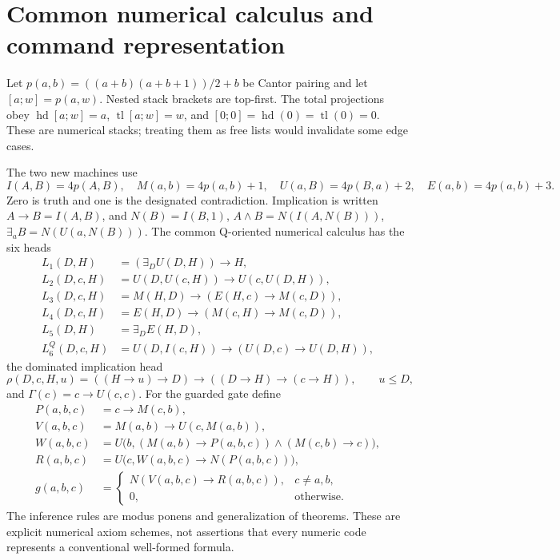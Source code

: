 \documentclass[11pt]{article}
\theoremstyle{definition}\newtheorem{definition}[theorem]{Definition}
\begin{document}
\section{Common numerical calculus and command representation}
\label{sec:calculus}

Let $p(a,b)=((a+b)(a+b+1))/2+b$ be Cantor pairing and let
$[a;w]=p(a,w)$. Nested stack brackets are top-first. The total projections
obey $\operatorname{hd}[a;w]=a$, $\operatorname{tl}[a;w]=w$, and
$[0;0]=\operatorname{hd}(0)=\operatorname{tl}(0)=0$. These are numerical
stacks; treating them as free lists would invalidate some edge cases.

The two new machines use
\[
 I(A,B)=4p(A,B),\quad M(a,b)=4p(a,b)+1,\quad
 U(a,B)=4p(B,a)+2,\quad E(a,b)=4p(a,b)+3.
\]
Zero is truth and one is the designated contradiction. Implication is
written $A\to B=I(A,B)$, and $N(B)=I(B,1)$,
$A\wedge B=N(I(A,N(B)))$, $\exists_aB=N(U(a,N(B)))$.
The common Q-oriented numerical calculus has the six heads
\begin{align*}
 L_1(D,H)&=(\exists_D U(D,H))\to H,\\
 L_2(D,c,H)&=U(D,U(c,H))\to U(c,U(D,H)),\\
 L_3(D,c,H)&=M(H,D)\to(E(H,c)\to M(c,D)),\\
 L_4(D,c,H)&=E(H,D)\to(M(c,H)\to M(c,D)),\\
 L_5(D,H)&=\exists_D E(H,D),\\
 L_6^Q(D,c,H)&=U(D,I(c,H))\to(U(D,c)\to U(D,H)),
\end{align*}
the dominated implication head
\[
 \rho(D,c,H,u)=((H\to u)\to D)\to((D\to H)\to(c\to H)),
 \qquad u\le D,
\]
and $\Gamma(c)=c\to U(c,c)$. For the guarded gate define
\begin{align*}
 P(a,b,c)&=c\to M(c,b),\\
 V(a,b,c)&=M(a,b)\to U(c,M(a,b)),\\
 W(a,b,c)&=U\bigl(b,(M(a,b)\to P(a,b,c))\wedge(M(c,b)\to c)\bigr),\\
 R(a,b,c)&=U\bigl(c,W(a,b,c)\to N(P(a,b,c))\bigr),\\
 g(a,b,c)&=\begin{cases}N(V(a,b,c)\to R(a,b,c)),&c\ne a,b,\\
 0,&\text{otherwise.}\end{cases}
\end{align*}
The inference rules are modus ponens and generalization of theorems.
These are explicit numerical axiom schemes, not assertions that every
numeric code represents a conventional well-formed formula.
\end{document}
